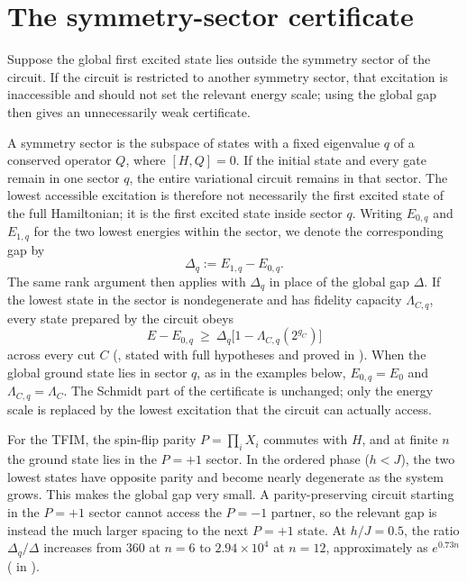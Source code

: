 \documentclass[reprint,aps,pra,floatfix,superscriptaddress,nofootinbib,longbibliography]{revtex4-2}
\theoremstyle{remark}
\theoremstyle{definition}
\begin{document}
\section{The symmetry-sector certificate}
\label{sec:sector}

Suppose the global first excited state lies outside the symmetry sector of the
circuit. If the circuit is restricted to another symmetry sector, that
excitation is inaccessible and should not set the relevant energy scale; using
the global gap then gives an unnecessarily weak certificate.

A symmetry sector is the subspace of states with a fixed eigenvalue $q$ of a
conserved operator $Q$, where $[H,Q]=0$. If the initial state and every gate
remain in one sector $q$, the entire variational circuit remains in that sector.
The lowest accessible excitation is therefore not necessarily the first excited
state of the full Hamiltonian; it is the first excited state inside sector $q$.
Writing $E_{0,q}$ and $E_{1,q}$ for the two lowest energies within the sector, we
denote the corresponding gap by
\begin{equation}
  \Delta_q:=E_{1,q}-E_{0,q}.
\end{equation}
The same rank argument then applies with $\Delta_q$ in place of the global gap
$\Delta$. If the lowest state in the sector is nondegenerate and has fidelity
capacity $\Lambda_{C,q}$, every state prepared by the circuit obeys
\begin{equation}
  \label{eq:sectorfloor}
  E - E_{0,q}\ \ge\ \Delta_q\bigl[1-\Lambda_{C,q}(2^{g_C})\bigr]
\end{equation}
across every cut $C$ (, stated with full hypotheses and proved
in ). When the global ground state lies in sector $q$, as in the
examples below, $E_{0,q}=E_0$ and $\Lambda_{C,q}=\Lambda_C$. The Schmidt part of
the certificate is unchanged; only the energy scale is replaced by the lowest
excitation that the circuit can actually access.

For the TFIM, the spin-flip parity $P=\prod_iX_i$ commutes with $H$, and at
finite $n$ the ground state lies in the $P=+1$ sector. In the ordered phase
($h<J$), the two lowest states have opposite parity and become nearly degenerate
as the system grows. This makes the global gap very small. A parity-preserving
circuit starting in the $P=+1$ sector cannot access the $P=-1$ partner, so the
relevant gap is instead the much larger spacing to the next $P=+1$ state. At
$h/J=0.5$, the ratio $\Delta_q/\Delta$ increases from $360$ at $n=6$ to
$2.94\times10^4$ at $n=12$, approximately as $e^{0.73n}$
( in ).
\end{document}
